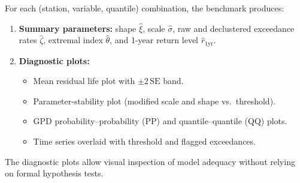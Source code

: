 For each (station, variable, quantile) combination, the benchmark produces:
\begin{enumerate}
  \item \textbf{Summary parameters:} shape $\hat{\xi}$, scale $\hat{\sigma}$, raw and declustered exceedance rates $\hat{\zeta}$, extremal index $\hat{\theta}$, and 1-year return level $\hat{r}_{1\text{yr}}$.
  \item \textbf{Diagnostic plots:}
    \begin{itemize}
      \item Mean residual life plot with $\pm 2\,\text{SE}$ band.
      \item Parameter-stability plot (modified scale and shape vs.~threshold).
      \item GPD probability--probability (PP) and quantile--quantile (QQ) plots.
      \item Time series overlaid with threshold and flagged exceedances.
    \end{itemize}
\end{enumerate}

The diagnostic plots allow visual inspection of model adequacy without relying on formal hypothesis tests.

